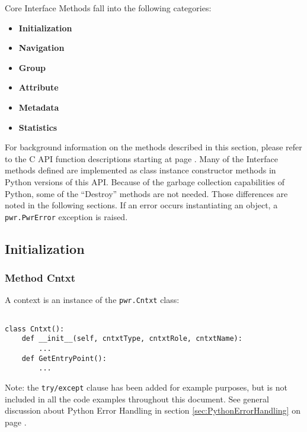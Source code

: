 \documentclass[12pt]{report} %
\begin{document}
\begin{appendices}
Core Interface Methods fall into the following categories:
\begin{itemize}[noitemsep,nolistsep]
\item{\textbf{Initialization}}
\item{\textbf{Navigation}}
\item{\textbf{Group}}
\item{\textbf{Attribute}}
\item{\textbf{Metadata}}
\item{\textbf{Statistics}}
\end{itemize}

For background information on the methods described in this section, please refer to
the C API function descriptions starting at page \pageref{chap:Common}. Many of
the Interface methods defined are implemented as class instance constructor
methods in Python versions of this API. Because of the garbage collection
capabilities of Python, some of the ``Destroy'' methods are not needed. Those
differences are noted in the following sections. If an error occurs
instantiating an object, a \texttt{pwr.PwrError} exception is raised.

\subsection{Initialization} \label{sec:PythonInitialization}

\subsubsection{Method Cntxt} \label{meth:Cntxt}

A context is an instance of the \texttt{pwr.Cntxt} class:
\begin{center}\begin{minipage}{.95\linewidth}\begin{lstlisting}

class Cntxt():
    def __init__(self, cntxtType, cntxtRole, cntxtName):
        ...
    def GetEntryPoint():
        ...
\end{lstlisting}\end{minipage}\end{center}

Note: the \texttt{try/except} clause has been added for example purposes, but
is not included in all the code examples throughout this document.  See general
discussion about Python Error Handling in section \ref{sec:PythonErrorHandling}
on page \pageref{sec:PythonErrorHandling}.


\end{appendices}
\end{document}
